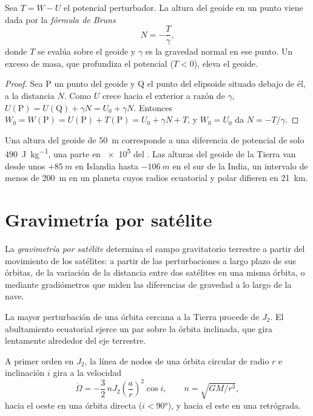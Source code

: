 \begin{proposition}\label{prop:b3:gravity-geodesy:bruns}
Sea $T = W - U$ el potencial perturbador. La altura del geoide en un punto viene
dada por la \emph{fórmula de Bruns}
\[
  N = -\frac{T}{\gamma},
\]
donde $T$ se evalúa sobre el geoide y $\gamma$ es la gravedad normal en ese punto. Un
exceso de masa, que profundiza el potencial ($T < 0$), eleva el geoide.
\end{proposition}

\begin{proof}
Sea P un punto del geoide y Q el punto del elipsoide situado debajo de él, a la distancia
$N$. Como $U$ crece hacia el exterior a razón de $\gamma$,
$U(\mathrm P) = U(\mathrm Q) + \gamma N = U_0 + \gamma N$. Entonces
$W_0 = W(\mathrm P) = U(\mathrm P) + T(\mathrm P) = U_0 + \gamma N + T$, y
$W_0 = U_0$ da $N = -T/\gamma$.
\end{proof}

Una altura del geoide de \qty{50}{m} corresponde a una diferencia de potencial de solo
\qty{490}{J.kg^{-1}}, una parte en \num{e5} del . Las alturas del geoide
de la Tierra van desde unos $+\qty{85}{m}$ en Islandia hasta
$-\qty{106}{m}$ en el sur de la India,
un intervalo de menos de \qty{200}{m} en un planeta cuyos radios ecuatorial y polar
difieren en \qty{21}{km}.

\section{Gravimetría por satélite}

\begin{definition}\label{def:b3:gravity-geodesy:satgrav}
La \emph{gravimetría por satélite} determina el campo
gravitatorio terrestre a partir del movimiento de los satélites: a partir de las
perturbaciones a largo plazo de sus órbitas, de la variación de la distancia entre
dos satélites en una misma órbita, o mediante gradiómetros que miden las diferencias
de gravedad a lo largo de la nave.
\end{definition}

La mayor perturbación de una órbita cercana a la Tierra procede de $J_2$. El
abultamiento ecuatorial ejerce un par sobre la órbita inclinada, que gira lentamente
alrededor del eje terrestre.

\begin{proposition}\label{prop:b3:gravity-geodesy:nodal}
A primer orden en $J_2$, la línea de nodos de una órbita circular de radio $r$ e
inclinación $i$ gira a la velocidad
\[
  \dot\Omega = -\frac32\,nJ_2\left(\frac ar\right)^2\cos i,\qquad n = \sqrt{GM/r^3} ,
\]
hacia el oeste en una órbita directa ($i < \ang{90}$), y hacia el este en una retrógrada.
\end{proposition}

